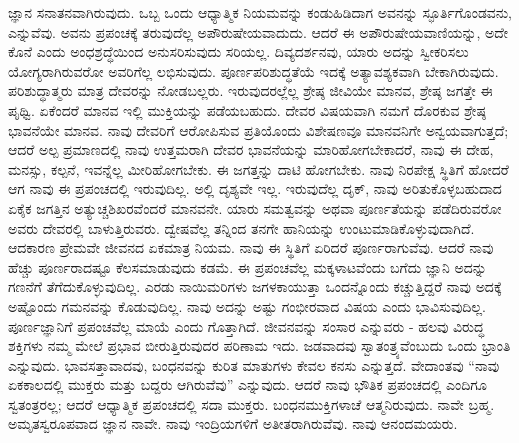 ಜ್ಞಾನ ಸನಾತನವಾಗಿರುವುದು. ಒಬ್ಬ ಒಂದು ಆಧ್ಯಾತ್ಮಿಕ ನಿಯಮವನ್ನು ಕಂಡುಹಿಡಿದಾಗ ಅವನನ್ನು ಸ್ಫೂರ್ತಿಗೊಂಡವನು, ಎನ್ನುವೆವು. ಅವನು ಪ್ರಪಂಚಕ್ಕೆ ತರುವುದೆಲ್ಲ ಅಪೌರುಷೇಯವಾದುದು. ಆದರೆ ಈ ಅಪೌರುಷೇಯವಾಣಿಯನ್ನು, ಅದೇ ಕೊನೆ ಎಂದು ಅಂಧಶ್ರದ್ಧೆಯಿಂದ ಅನುಸರಿಸುವುದು ಸರಿಯಲ್ಲ. ದಿವ್ಯದರ್ಶನವು, ಯಾರು ಅದನ್ನು ಸ್ವೀಕರಿಸಲು ಯೋಗ್ಯರಾಗಿರುವರೋ ಅವರಿಗೆಲ್ಲ ಲಭಿಸುವುದು. ಪೂರ್ಣಪರಿಶುದ್ಧತೆಯೆ ಇದಕ್ಕೆ ಅತ್ಯಾವಶ್ಯಕವಾಗಿ ಬೇಕಾಗಿರುವುದು. ಪರಿಶುದ್ಧಾತ್ಮರು ಮಾತ್ರ ದೇವರನ್ನು ನೋಡಬಲ್ಲರು. ಇರುವುದರಲ್ಲೆಲ್ಲ ಶ್ರೇಷ್ಠ ಜೀವಿಯೇ ಮಾನವ, ಶ್ರೇಷ್ಠ ಜಗತ್ತೇ ಈ ಪೃಥ್ವಿ. ಏಕೆಂದರೆ ಮಾನವ ಇಲ್ಲಿ ಮುಕ್ತಿಯನ್ನು ಪಡೆಯಬಹುದು. ದೇವರ ವಿಷಯವಾಗಿ ನಮಗೆ ದೊರಕುವ ಶ್ರೇಷ್ಠ ಭಾವನೆಯೇ ಮಾನವ. ನಾವು ದೇವರಿಗೆ ಆರೋಪಿಸುವ ಪ್ರತಿಯೊಂದು ವಿಶೇಷಣವೂ ಮಾನವನಿಗೇ ಅನ್ವಯವಾಗುತ್ತದೆ; ಆದರೆ ಅಲ್ಪ ಪ್ರಮಾಣದಲ್ಲಿ ನಾವು ಉತ್ತಮರಾಗಿ ದೇವರ ಭಾವನೆಯನ್ನು ಮಾರಿಹೋಗಬೇಕಾದರೆ, ನಾವು ಈ ದೇಹ, ಮನಸ್ಸು, ಕಲ್ಪನೆ, ಇವನ್ನೆಲ್ಲ ಮೀರಿಹೋಗಬೇಕು. ಈ ಜಗತ್ತನ್ನು ದಾಟಿ ಹೋಗಬೇಕು. ನಾವು ನಿರಪೇಕ್ಷ ಸ್ಥಿತಿಗೆ ಹೋದರೆ ಆಗ ನಾವು ಈ ಪ್ರಪಂಚದಲ್ಲಿ ಇರುವುದಿಲ್ಲ. ಅಲ್ಲಿ ದೃಶ್ಯವೇ ಇಲ್ಲ. ಇರುವುದೆಲ್ಲ ದೃಕ್, ನಾವು ಅರಿತುಕೊಳ್ಳಬಹುದಾದ ಏಕೈಕ ಜಗತ್ತಿನ ಅತ್ಯುಚ್ಚ\break ಶಿಖರವೆಂದರೆ ಮಾನವನೇ. ಯಾರು ಸಮತ್ವವನ್ನು ಅಥವಾ ಪೂರ್ಣತೆಯನ್ನು ಪಡೆದಿರುವರೋ ಅವರು ದೇವರಲ್ಲಿ ಬಾಳುತ್ತಿರುವರು. ದ್ವೇಷವೆಲ್ಲ ತನ್ನಿಂದ ತನಗೇ ಹಾನಿಯನ್ನು ಉಂಟುಮಾಡಿಕೊಳ್ಳುವುದಾಗಿದೆ. ಆದಕಾರಣ ಪ್ರೇಮವೇ ಜೀವನದ ಏಕಮಾತ್ರ ನಿಯಮ. ನಾವು ಈ ಸ್ಥಿತಿಗೆ ಏರಿದರೆ ಪೂರ್ಣರಾಗುವೆವು. ಆದರೆ ನಾವು ಹೆಚ್ಚು ಪೂರ್ಣರಾದಷ್ಟೂ ಕೆಲಸಮಾಡುವುದು ಕಡಮೆ. ಈ ಪ್ರಪಂಚವೆಲ್ಲ ಮಕ್ಕಳಾಟವೆಂದು ಬಗೆದು ಜ್ಞಾನಿ ಅದನ್ನು ಗಣನೆಗೆ ತೆಗೆದುಕೊಳ್ಳುವುದಿಲ್ಲ. ಎರಡು ನಾಯಿಮರಿಗಳು ಜಗಳಕಾಯುತ್ತಾ ಒಂದನ್ನೊಂದು ಕಚ್ಚುತ್ತಿದ್ದರೆ ನಾವು ಅದಕ್ಕೆ ಅಷ್ಟೊಂದು ಗಮನವನ್ನು ಕೊಡುವುದಿಲ್ಲ. ನಾವು ಅದನ್ನು ಅಷ್ಟು ಗಂಭೀರವಾದ ವಿಷಯ ಎಂದು ಭಾವಿಸುವುದಿಲ್ಲ. ಪೂರ್ಣಜ್ಞಾನಿಗೆ ಪ್ರಪಂಚವೆಲ್ಲ ಮಾಯೆ ಎಂದು ಗೊತ್ತಾಗಿದೆ. ಜೀವನವನ್ನು ಸಂಸಾರ ಎನ್ನುವರು - ಹಲವು ವಿರುದ್ಧ ಶಕ್ತಿಗಳು ನಮ್ಮ ಮೇಲೆ ಪ್ರಭಾವ ಬೀರುತ್ತಿರುವುದರ ಪರಿಣಾಮ ಇದು. ಜಡವಾದವು ಸ್ವಾತಂತ್ರ್ಯವೆಂಬುದು ಒಂದು ಭ್ರಾಂತಿ ಎನ್ನುವುದು. ಭಾವಸತ್ತಾವಾದವು, ಬಂಧನವನ್ನು ಕುರಿತ ಮಾತುಗಳು ಕೇವಲ ಕನಸು ಎನ್ನುತ್ತದೆ. ವೇದಾಂತವು “ನಾವು ಏಕಕಾಲದಲ್ಲಿ ಮುಕ್ತರು ಮತ್ತು ಬದ್ದರು ಆಗಿರುವೆವು'' ಎನ್ನುವುದು. ಆದರೆ ನಾವು ಭೌತಿಕ ಪ್ರಪಂಚದಲ್ಲಿ ಎಂದಿಗೂ ಸ್ವತಂತ್ರರಲ್ಲ; ಆದರೆ ಆಧ್ಯಾತ್ಮಿಕ ಪ್ರಪಂಚದಲ್ಲಿ ಸದಾ ಮುಕ್ತರು. ಬಂಧನಮುಕ್ತಿಗಳಾಚೆ ಆತ್ಮನಿರುವುದು. ನಾವೇ ಬ್ರಹ್ಮ. ಅಮೃತಸ್ವರೂಪವಾದ ಜ್ಞಾನ ನಾವೇ. ನಾವು ಇಂದ್ರಿಯಗಳಿಗೆ ಅತೀತರಾಗಿರುವೆವು. ನಾವು ಆನಂದಮಯರು.

